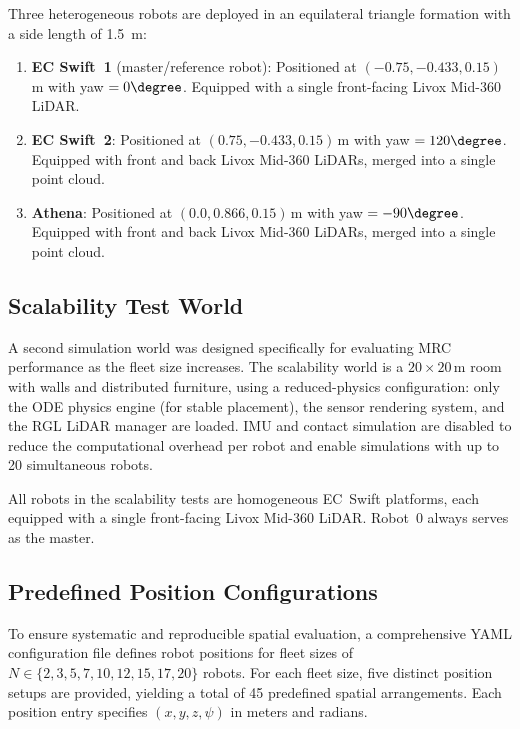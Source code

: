 Three heterogeneous robots are deployed in an equilateral triangle
formation with a side length of \SI{1.5}{\metre}:
\begin{enumerate}
    \item \textbf{EC Swift~1} (master/reference robot):
          Positioned at $(-0.75, -0.433, 0.15)$\,m with yaw $= 0\degree$.
          Equipped with a single front-facing Livox Mid-360 LiDAR.
    \item \textbf{EC Swift~2}:
          Positioned at $(0.75, -0.433, 0.15)$\,m with yaw $= 120\degree$.
          Equipped with front and back Livox Mid-360 LiDARs, merged
          into a single point cloud.
    \item \textbf{Athena}:
          Positioned at $(0.0, 0.866, 0.15)$\,m with yaw $= -90\degree$.
          Equipped with front and back Livox Mid-360 LiDARs, merged
          into a single point cloud.
\end{enumerate}

\subsection{Scalability Test World}
\label{sec:scale_world}

A second simulation world was designed specifically for evaluating
MRC performance as the fleet size increases.
The scalability world is a $20 \times 20$\,m room with walls and
distributed furniture, using a reduced-physics configuration: only
the ODE physics engine (for stable placement), the sensor rendering
system, and the RGL LiDAR manager are loaded.
IMU and contact simulation are disabled to reduce the computational
overhead per robot and enable simulations with up to 20 simultaneous
robots.

All robots in the scalability tests are homogeneous EC~Swift platforms,
each equipped with a single front-facing Livox Mid-360 LiDAR.
Robot~0 always serves as the master.

\subsection{Predefined Position Configurations}
\label{sec:position_configs}

To ensure systematic and reproducible spatial evaluation, a
comprehensive YAML configuration file defines robot positions
for fleet sizes of $N \in \{2, 3, 5, 7, 10, 12, 15, 17, 20\}$
robots.
For each fleet size, five distinct position setups are provided,
yielding a total of 45 predefined spatial arrangements.
Each position entry specifies $(x, y, z, \psi)$ in meters and
radians.

